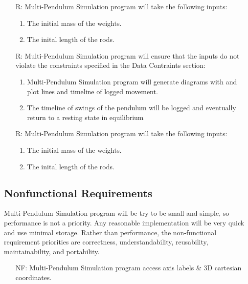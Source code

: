 \documentclass[12pt]{article}
\newcounter{reqnum} %
\newcounter{nfreqnum} %
\newcommand{\progname}{Multi-Pendulum Simulation }
\begin{document}
\noindent \begin{itemize}

\item[R\refstepcounter{reqnum}\thereqnum:] \progname program will 
  take the following inputs:
  \begin{enumerate} \item The initial mass of the weights. 
                    \item The inital length of the rods.
  \end{enumerate}

\item[R\refstepcounter{reqnum}\thereqnum:] \progname program
will ensure that the inputs do not violate the constraints specified in the Data Contraints section:
    \begin{enumerate} \item \progname program will 
generate diagrams with and plot lines and timeline of logged movement. 
\item The timeline of swings of the pendulum will be logged and eventually
return to a resting state in equilibrium
\end{enumerate}

\item[R\refstepcounter{reqnum}\thereqnum:] \progname program will 
  take the following inputs:
  \begin{enumerate} \item The initial mass of the weights. 
                    \item The inital length of the rods.
  \end{enumerate}

\end{itemize}
\newpage
\subsection{Nonfunctional Requirements}

\progname program will be try to be small and simple, so performance is not a 
priority. Any reasonable implementation will be very quick and use minimal 
storage. Rather than performance, the non-functional requirement priorities 
are correctness, understandability, reusability, maintainability, and 
portability. 

\begin{itemize}
\item[NF\refstepcounter{nfreqnum}\thenfreqnum:] \progname program access axis
labels \& 3D cartesian coordinates.
\end{itemize}
\end{document}
